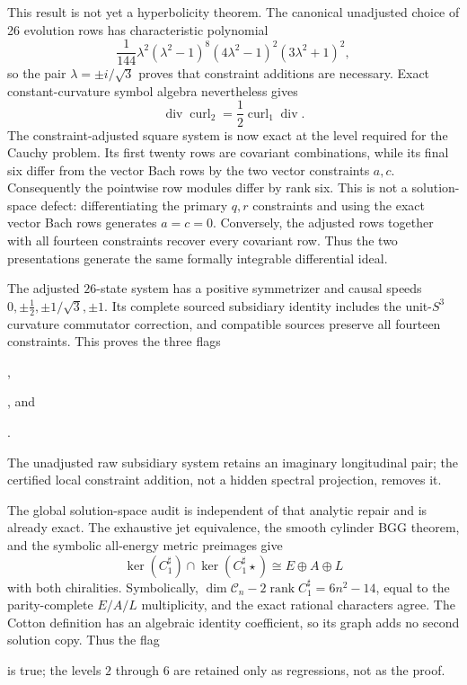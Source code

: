 \documentclass[11pt]{article}
\theoremstyle{definition}
\theoremstyle{remark}
\newcommand{\rank}{\operatorname{rank}}
\begin{document}
This result is not yet a hyperbolicity theorem.  The canonical unadjusted
choice of 26 evolution rows has characteristic polynomial
\begin{equation}\label{eq:EB-unadjusted-characteristic}
 \frac1{144}\lambda^2(\lambda^2-1)^8
 (4\lambda^2-1)^2(3\lambda^2+1)^2,
\end{equation}
so the pair $\lambda=\pm i/\sqrt3$ proves that constraint additions are
necessary.  Exact constant-curvature symbol algebra nevertheless gives
\begin{equation}\label{eq:EB-principal-constraint}
 \operatorname{div}\operatorname{curl}_2
 =\frac12\operatorname{curl}_1\operatorname{div}.
\end{equation}
The constraint-adjusted square system is now exact at the level required for
the Cauchy problem.  Its first twenty rows are covariant combinations, while
its final six differ from the vector Bach rows by the two vector constraints
$a,c$.  Consequently the pointwise row modules differ by rank six.  This is
not a solution-space defect: differentiating the primary $q,r$ constraints
and using the exact vector Bach rows generates $a=c=0$.  Conversely, the
adjusted rows together with all fourteen constraints recover every covariant
row.  Thus the two presentations generate the same formally integrable
differential ideal.

The adjusted $26$-state system has a positive symmetrizer and causal speeds
$0,\pm\frac12,\pm1/\sqrt3,\pm1$.  Its complete sourced subsidiary identity
includes the unit-$S^3$ curvature commutator correction, and compatible
sources preserve all fourteen constraints.  This proves the three flags
\begin{center}\small
{},\par
{}, and\par
{}.
\end{center}
The unadjusted raw subsidiary
system retains an imaginary longitudinal pair; the certified local
constraint addition, not a hidden spectral projection, removes it.

The global solution-space audit is independent of that analytic repair and
is already exact.  The exhaustive jet equivalence, the smooth cylinder BGG
theorem, and the symbolic all-energy metric preimages give
\begin{equation}
 \ker(C_1^\sharp)\cap\ker(C_1^\sharp\star)
 \cong E\oplus A\oplus L
\end{equation}
with both chiralities.  Symbolically,
$\dim\mathcal C_n-2\rank C_1^\sharp=6n^2-14$, equal to the parity-complete
$E/A/L$ multiplicity, and the exact rational characters agree.  The Cotton
definition has an algebraic identity coefficient, so its graph adds no
second solution copy.  Thus the flag
\begin{center}\small
{}
\end{center}
is true; the levels $2$ through $6$ are retained only as regressions, not as
the proof.
\end{document}

